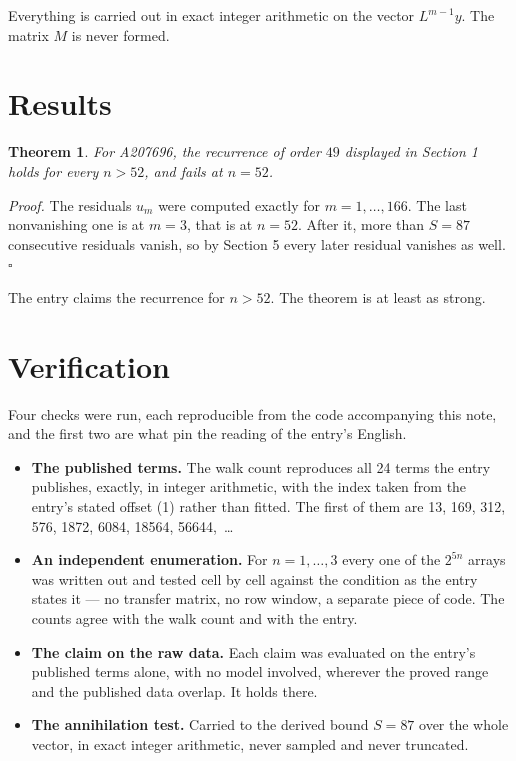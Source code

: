 \documentclass[11pt]{article}
\newtheorem{theorem}{Theorem}
\theoremstyle{definition}
\begin{document}
Everything is carried out in exact integer arithmetic on the vector $L^{m-1}y$. The matrix $M$ is never formed.

\section{Results}

\begin{theorem} For A207696, the recurrence of order $49$ displayed in Section 1 holds for every $n > 52$, and fails at $n = 52$.\end{theorem}

{\itshape Proof.} The residuals $u_m$ were computed exactly for $m = 1,\dots,166$. The last nonvanishing one is at $m = 3$, that is at $n = 52$. After it, more than $S = 87$ consecutive residuals vanish, so by Section 5 every later residual vanishes as well. $\square$

The entry claims the recurrence for $n > 52$. The theorem is at least as strong.

\section{Verification}

Four checks were run, each reproducible from the code accompanying this note, and the first two are what pin the reading of the entry's English.

\begin{itemize}

\item {\bfseries The published terms.} The walk count reproduces all 24 terms the entry publishes, exactly, in integer arithmetic, with the index taken from the entry's stated offset (1) rather than fitted. The first of them are 13, 169, 312, 576, 1872, 6084, 18564, 56644,~\dots

\item {\bfseries An independent enumeration.} For $n = 1,\dots,3$ every one of the $2^{5n}$ arrays was written out and tested cell by cell against the condition as the entry states it --- no transfer matrix, no row window, a separate piece of code. The counts agree with the walk count and with the entry.

\item {\bfseries The claim on the raw data.} Each claim was evaluated on the entry's published terms alone, with no model involved, wherever the proved range and the published data overlap. It holds there.

\item {\bfseries The annihilation test.} Carried to the derived bound $S = 87$ over the whole vector, in exact integer arithmetic, never sampled and never truncated.

\end{itemize}
\end{document}
